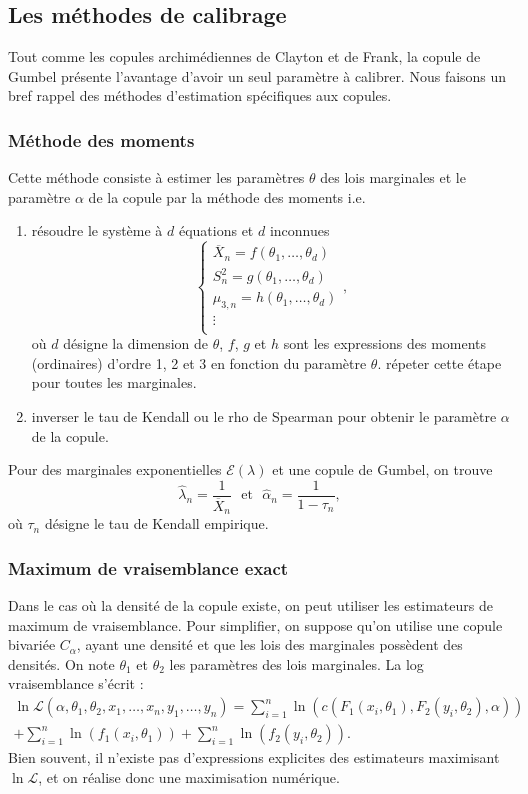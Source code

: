 \documentclass[11pt,a4paper]{article}
\begin{document}
\subsection{Les m\'ethodes de calibrage}
Tout comme les copules archim\'ediennes de Clayton et de Frank, la copule de Gumbel pr\'esente l'avantage d'avoir un seul param\`etre \`a calibrer.
Nous faisons un bref rappel des m\'ethodes d'estimation sp\'ecifiques aux copules.

\subsubsection{M\'ethode des moments}
Cette m\'ethode consiste \`a estimer les param\`etres $\theta$ des lois marginales et le param\`etre $\alpha$ de la copule par la m\'ethode des moments i.e.
\begin{enumerate}
\item r\'esoudre le syst\`eme \`a $d$ \'equations et $d$ inconnues
$$
\left\{ \begin{array}{c}
\overline X_n = f(\theta_1,\dots,\theta_d)\\
S_n^2 = g(\theta_1,\dots,\theta_d)\\
\mu_{3,n} = h(\theta_1,\dots,\theta_d)\\
\vdots\\
\end{array}
\right. ,
$$
o\`u $d$ d\'esigne la dimension de $\theta$, $f$, $g$ et $h$ sont les expressions des moments (ordinaires) d'ordre 1, 2 et 3 en fonction du param\`etre $\theta$.
r\'epeter cette \'etape pour toutes les marginales.
\item inverser le tau de Kendall ou le rho de Spearman pour obtenir le param\`etre $\alpha$ de la copule.
\end{enumerate}

Pour des marginales exponentielles $\mathcal E(\lambda)$ et une copule de Gumbel, on trouve
$$
\hat \lambda_n = \frac{1}{\overline X_n}
\textrm{~~et~~}
\hat \alpha_n = \frac{1}{1-\tau_n},
$$
o\`u $\tau_n$ d\'esigne le tau de Kendall empirique. 


\subsubsection{Maximum de vraisemblance exact}
Dans le cas o\`u la densit\'e de la copule existe, on peut utiliser les estimateurs de maximum de vraisemblance. Pour simplifier, on suppose qu'on utilise une copule
bivari\'ee $C_\alpha$, ayant une densit\'e et que les lois des marginales poss\`edent des densit\'es. On note $\theta_1$ et $\theta_2$ les param\`etres des lois 
marginales. La log vraisemblance s'\'ecrit :
\begin{multline*}
\ln \mathcal L(\alpha, \theta_1, \theta_2, x_1,\dots, x_n, y_1,\dots, y_n) = \sum_{i=1}^n \ln\left( c \left( F_1(x_i,\theta_1), F_2(y_i,\theta_2),\alpha \right)\right) \\
+\sum_{i=1}^n \ln\left(f_1(x_i,\theta_1) \right) + \sum_{i=1}^n \ln\left(f_2(y_i,\theta_2) \right).
\end{multline*}
Bien souvent, il n'existe pas d'expressions explicites des estimateurs maximisant $\ln \mathcal L$, et on r\'ealise donc une maximisation num\'erique.
\end{document}
